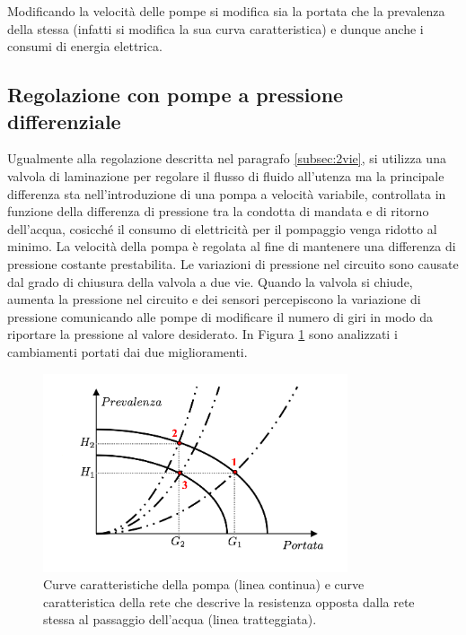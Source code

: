 \documentclass[laurea,oneside,11pt]{USiena_tesiLM}
\begin{document}
Modificando la velocità delle pompe si modifica sia la portata che la prevalenza della stessa (infatti si modifica la sua curva caratteristica) e dunque anche i consumi di energia elettrica. 

\subsection{Regolazione con pompe a pressione differenziale}
Ugualmente alla regolazione descritta nel paragrafo \ref{subsec:2vie}, si utilizza una valvola di laminazione per regolare il flusso di fluido all'utenza ma la principale differenza sta nell'introduzione di una pompa a velocità variabile, controllata in funzione della differenza di pressione tra la condotta di mandata e di ritorno dell'acqua, cosicché il consumo di elettricità per il pompaggio venga ridotto al minimo.
 La velocità della pompa è regolata al fine di mantenere una differenza di pressione costante prestabilita. Le variazioni di pressione nel circuito sono causate dal grado di chiusura della valvola a due vie. Quando la valvola si chiude, aumenta la pressione nel circuito e dei sensori percepiscono la variazione di pressione comunicando alle pompe di modificare il numero di giri in modo da riportare la pressione al valore desiderato. In Figura \ref{fig:giri_variabili} sono analizzati i cambiamenti portati dai due miglioramenti.

\begin{figure}[!ht]
\centering
\includegraphics[width=0.8\textwidth]{figure/giri_variabili}
\caption{Curve caratteristiche della pompa (linea continua) e curve caratteristica della rete che descrive la resistenza opposta dalla rete stessa al passaggio dell'acqua (linea tratteggiata).}
\label{fig:giri_variabili}
\end{figure}
\end{document}
